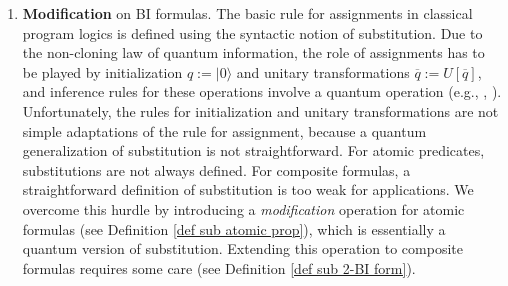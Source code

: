 \documentclass[conference,compsoc, 10pt]{IEEEtran}
\newcommand{\jh}[1]{\textit{\color{red}[JH] : #1}}
\newcommand{\lz}[1]{\textit{\color{blue}[LZ] : #1}}
\newcommand {\qbar} {{\overline{q}}}
\def\>{\ensuremath{\rangle}}
\begin{document}
\begin{enumerate}
        \item \textbf{Modification} on BI formulas.  The basic rule
          for assignments in classical program logics is defined using
          the syntactic notion of substitution. Due to the non-cloning
          law of quantum information, the role of assignments has to
          be played by initialization $q:=|0\>$ and unitary
          transformations $\qbar := U[\qbar]$, and inference rules for
          these operations involve a quantum operation (e.g.,
          \cite{Ying11}, \cite{ZYY19}). Unfortunately, the rules for
          initialization and unitary transformations are not simple
          adaptations of the rule for assignment, because a quantum
          generalization of substitution is not straightforward. For
          atomic predicates, substitutions are not always defined. For
          composite formulas, a straightforward definition of
          substitution is too weak for applications.
      We overcome this hurdle
      by introducing a \emph{modification} operation for atomic formulas (see
      Definition \ref{def sub atomic prop}), which is essentially a quantum version of substitution. Extending this operation to composite formulas requires some care (see Definition \ref{def sub 2-BI form}).    
		

\end{enumerate}
\end{document}
